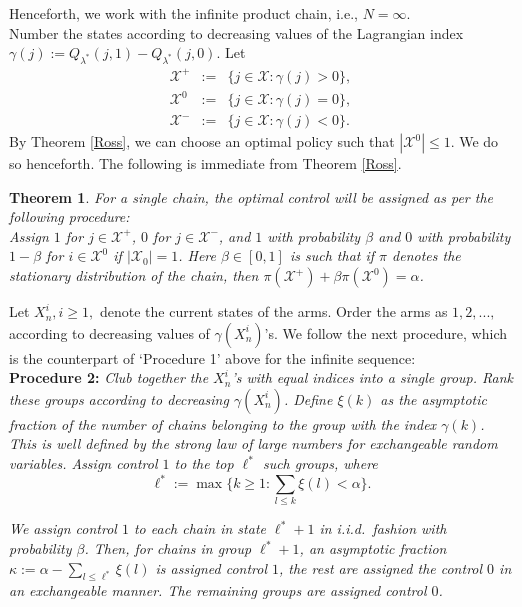 \documentclass[12pt]{article}
\newtheorem{theorem}{Theorem}[section]
\numberwithin{equation}{section}
\newcommand{\1}{\textbf{1}}
\newcommand{\X}{\mathcal{X}}
\begin{document}
Henceforth, we work with the infinite product chain, i.e., $N = \infty$.\\

Number the states according to decreasing values of the Lagrangian  index $\gamma(j) := Q_{\lambda^*}(j,1) - Q_{\lambda^*}(j,0)$. Let 
\begin{eqnarray*}
\X^+ &:=& \{j\in \X: \gamma(j) > 0\}, \\ 
\X^0 &:=&  \{j\in \X: \gamma(j) = 0\},\\
\X^-  &:=&  \{j\in \X: \gamma(j) < 0\}.
\end{eqnarray*} 
By Theorem \ref{Ross}, we can choose an optimal policy such that $|\X^0| \leq 1$. We do so henceforth. The following is immediate from Theorem \ref{Ross}.

\begin{theorem}\label{singlechain} For a single chain, the optimal control will be assigned as per the following procedure:\\

\textit{Assign $1$ for $j \in \X^+$, $0$ for $j\in \X^-$, and $1$ with probability $\beta$ and $0$ with probability $1-\beta$ for $i\in \X^0$ if $|\X_0| = 1$. Here $\beta \in [0,1]$ is such that if $\pi$ denotes the stationary distribution of the chain, then $\pi(\X^+) + \beta\pi(\X^0) = \alpha$. } 
\end{theorem}

Let $X^i_n, i\ge 1,$ denote the current states of the arms. Order the arms as $1, 2,...,$ according to decreasing values of $\gamma(X^i_n)$'s. We follow the next procedure, which is the counterpart of `Procedure 1' above for the infinite sequence: \\

\noindent \textbf{Procedure 2:} \textit{Club together the $X^i_n$'s with equal indices into a single group. Rank these groups according to decreasing $\gamma(X^i_n)$. 
Define $\xi(k)$ as the asymptotic fraction of the number of chains belonging to the group with the index $\gamma(k)$.
This is well defined by the strong law of large numbers for exchangeable random variables.
Assign control $1$ to the top $\ell^*$ such groups, where\\
}
$$\ell^* := \max\{k \geq 1: \sum_{l\le k} \xi(l) < \alpha \}.$$

\textit{We assign control $1$ to each chain in state $\ell^*+1$ in i.i.d.\ fashion with probability $\beta$.
Then, for chains in group $\ell^*+1$, an asymptotic fraction $\kappa := \alpha - \sum_{l\le \ell^*} \xi(l)$ 
is assigned control $1$, the rest are assigned the control $0$ in an exchangeable manner. The remaining groups are assigned control $0$.}\\
\end{document}
